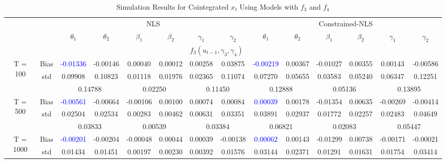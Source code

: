\documentclass[a4paper,12pt,times,numbered,print,index]{report}
\numberwithin{equation}{section}
\begin{document}
\begin{table}[htbp]
  \centering
  \caption{Simulation Results for Cointegrated $x_t$ Using Models with $f_3$ and $f_4$}
    \begin{adjustbox}{max width=\textwidth}
    \begin{tabular}{cccccccccccccc}
    \toprule
          &       & \multicolumn{6}{c}{NLS}                       & \multicolumn{6}{c}{Constrained-NLS} \\
          &       & $\theta_1$ & $\theta_2$ & $\beta_1$ & $\beta_2$ & $\gamma_1$ & $\gamma_2$ & $\theta_1$ & $\theta_2$ & $\beta_1$ & $\beta_2$ & $\gamma_1$ & $\gamma_2$ \\
    \midrule
    &       & \multicolumn{10}{c}{$f_3 (u_{t-1}, \gamma_3, \gamma_4)$}                \\
    \midrule
    \multirow{3}[1]{*}{T = 100} & Bias  & \textcolor{blue}{-0.01336} & -0.00146 & 0.00040 & 0.00012 & 0.00258 & 0.03875 & \textcolor{blue}{-0.00219} & 0.00367 & -0.01027 & 0.00355 & 0.00143 & -0.00586 \\
          & std   & 0.09908 & 0.10823 & 0.01118 & 0.01976 & 0.02365 & 0.11074 & 0.07270 & 0.05655 & 0.03583 & 0.05240 & 0.06347 & 0.12251 \\
          &       & \multicolumn{2}{c}{0.14788} & \multicolumn{2}{c}{0.02250} & \multicolumn{2}{c}{0.11450} & \multicolumn{2}{c}{0.12888} & \multicolumn{2}{c}{0.05136} & \multicolumn{2}{c}{0.13895} \\
    \multirow{3}[0]{*}{T = 500} & Bias  & \textcolor{blue}{-0.00561} & -0.00664 & -0.00106 & 0.00100 & 0.00074 & 0.00084 & \textcolor{blue}{0.00039} & 0.00178 & -0.01354 & 0.00635 & -0.00269 & -0.00414 \\
          & std   & 0.02504 & 0.02534 & 0.00283 & 0.00462 & 0.00631 & 0.03351 & 0.03891 & 0.02937 & 0.01772 & 0.02257 & 0.02483 & 0.04649 \\
          &       & \multicolumn{2}{c}{0.03833} & \multicolumn{2}{c}{0.00539} & \multicolumn{2}{c}{0.03384} & \multicolumn{2}{c}{0.06821} & \multicolumn{2}{c}{0.02083} & \multicolumn{2}{c}{0.05447} \\
    \multirow{3}[1]{*}{T = 1000} & Bias  & \textcolor{blue}{-0.00201} & -0.00204 & -0.00048 & 0.00044 & 0.00039 & -0.00138 & \textcolor{blue}{0.00062} & 0.00143 & -0.01299 & 0.00738 & -0.00171 & -0.00021 \\
          & std   & 0.01434 & 0.01451 & 0.00197 & 0.00230 & 0.00392 & 0.01576 & 0.03144 & 0.02371 & 0.01291 & 0.01631 & 0.01754 & 0.03414 \\

\end{tabular}
\end{adjustbox}
\end{table}
\end{document}
